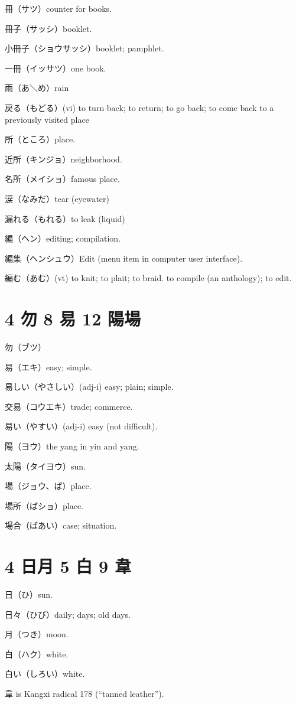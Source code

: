冊（サツ）counter for books.

冊子（サッシ）booklet.

小冊子（ショウサッシ）booklet; pamphlet.

一冊（イッサツ）one book.

雨（あ＼め）rain

戻る（もどる）(vi) to turn back; to return; to go back;
to come back to a previously visited place

所（ところ）place.

近所（キンジョ）neighborhood.

名所（メイショ）famous place.

涙（なみだ）tear (eyewater)

漏れる（もれる）to leak (liquid)

編（ヘン）editing; compilation.

編集（ヘンシュウ）Edit (menu item in computer user interface).

編む（あむ）(vt)
to knit; to plait; to braid.
to compile (an anthology); to edit.

\section{4 勿 8 易 12 陽場}

勿（ブツ）

易（エキ）easy; simple.

易しい（やさしい）(adj-i) easy; plain; simple.

交易（コウエキ）trade; commerce.

易い（やすい）(adj-i) easy (not difficult).

陽（ヨウ）the yang in yin and yang.

太陽（タイヨウ）sun.

場（ジョウ、ば）place.

場所（ばショ）place.

場合（ばあい）case; situation.

\section{4 日月 5 白 9 韋}

日（ひ）sun.

日々（ひび）daily; days; old days.

月（つき）moon.

白（ハク）white.

白い（しろい）white.

韋 is Kangxi radical 178 (``tanned leather'').

